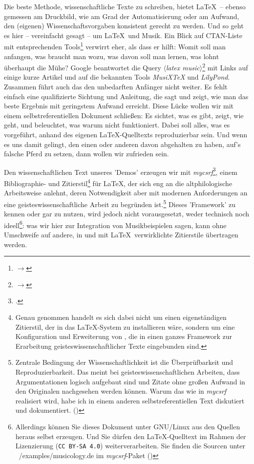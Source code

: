 Die beste Methode, wissenschaftliche Texte zu schreiben, bietet \LaTeX\ --
ebenso gemessen am Druckbild, wie am Grad der Automatisierung oder am Aufwand,
den (ei\-ge\-nen) Wissenschaftsvorgaben konsistent gerecht zu werden. Und so
geht es hier -- vereinfacht gesagt -- um \LaTeX\ und Musik. Ein Blick auf
CTAN-Liste mit entsprechenden Tools\footnote{$\rightarrow$
} verwirrt eher, als dass er
hilft: Womit soll man anfangen, was braucht man wozu, was davon soll man lernen,
was lohnt überhaupt die Mühe? Google beantwortet die Query
$\langle$\textit{latex music}$\rangle$\footnote{$\rightarrow$
} mit Links auf einige kurze
Artikel und auf die bekannten Tools \textit{MusiX\TeX} und \textit{LilyPond}.
Zusammen führt auch das den unbedarften Anfänger nicht weiter. Es fehlt einfach
eine qualifizierte Sichtung und Anleitung, die sagt und zeigt, wie man das beste
Ergebnis mit geringstem Aufwand erreicht. Diese Lücke wollen wir mit einem
selbstreferentiellen Dokument schließen: Es sichtet, was es gibt, zeigt, wie
geht, und beleuchtet, was warum nicht funktioniert. Dabei soll alles, was es
vorgeführt, anhand des eigenen \LaTeX-Quelltexts reproduzierbar sein. Und wenn
es uns damit gelingt, den einen oder anderen davon abgehalten zu haben, auf's
falsche Pferd zu setzen, dann wollen wir zufrieden sein.

Den wissenschaftlichen Text unseres 'Demos' erzeugen wir mit
\textit{mycsrf}\footcite[vgl.][\nopage wp.]{Reincke2018a}, einem Bibliographie-
und Zitierstil\footnote{Genau genommen handelt es sich dabei nicht um einen
eigenständigen Zitierstil, der in das \LaTeX-System zu installieren wäre,
sondern um eine Konfiguration und Erweiterung von , die in einen
ganzes Framework zur Erarbeitung geisteswissenschaftlicher Texte eingebunden
sind.} für \LaTeX, der sich eng an die altphilologische Arbeitsweise anlehnt,
deren Notwendigkeit aber mit modernen Anforderungen an eine
geisteswissenschaftliche Arbeit zu begründen ist.\footnote{Zentrale Bedingung
der Wissenschaftlichkeit ist die Überprüfbarkeit und Reproduzierbarkeit. Das
meint bei geisteswissenschaftlichen Arbeiten, dass Argumentationen logisch
aufgebaut sind und Zitate ohne großen Aufwand in den Originalen nachgesehen
werden können. Warum das wie in \textit{mycsrf} realisiert wird, habe ich in
einem anderen selbstreferentiellen Text diskutiert und dokumentiert. (\cite[Vgl.
dazu][1ff]{Reincke2018b})} Dieses 'Framework' zu kennen oder gar zu nutzen, wird
jedoch nicht vorausgesetzt, weder technisch noch ideell\footnote{Allerdings
können Sie dieses Dokument unter GNU/Linux aus den Quellen heraus selbst
erzeugen. Und Sie dürfen den \LaTeX-Quelltext im Rahmen der Lizenzierung
(\texttt{CC BY-SA 4.0}) weiterverarbeiten. Sie finden die Sourcen unter
~/examples/musicology.de im \textit{mycsrf}-Paket (\cite[Vgl. dazu][\nopage
wp.]{Reincke2019a})}: was wir hier zur Integration von Musikbeispielen sagen,
kann ohne Umschweife auf andere, in und mit \LaTeX\ verwirklichte Zitierstile
übertragen werden.

